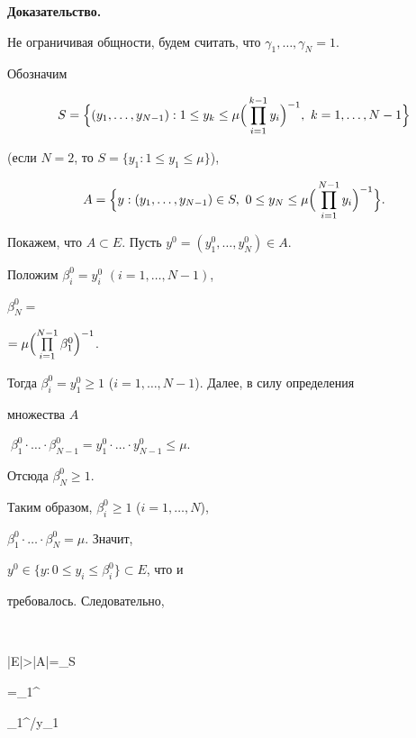  


{\bf Доказательство.} 


Не ограничивая общности, будем считать, что $\gamma_1,\dotsc,\gamma_N=1$.


Обозначим 


$$ 


S=\Bigl\{(y_1,\dotsc,y_{N-1}):1\le y_k\le \mu 


\Bigl(\,\prod^{k-1}_{i=1}y_i\Bigr)^{-1}, \ k=1,\dotsc,N-1\Bigr\} 


$$ 


(если $N=2$, то $S=\{y_1:1\le y_1\le\mu\}$), 


$$ 


A=\Bigl\{y:(y_1,\dotsc,y_{N-1})\in S, \ 


0\le y_N\le \mu 


\Bigl(\,\prod^{N-1}_{i=1}y_i\Bigr)^{-1}\Bigr\}. 


$$ 


Покажем, что $A\subset E$. Пусть $y^0=(y^0_1,\dotsc,y^0_N)\in A$. 


Положим $\beta^0_i=y^0_i$ $(i=1,\dotsc,N-1)$, 


$\beta^0_N=$\linebreak




$=\mu\Bigl(\prod\limits^{N-1}_{i=1}\beta^0_1\Bigr)^{-1}$. 


Тогда $\beta^0_i=y^0_1\ge 1$ ($i=1,\dotsc,N-1$). Далее, в силу определения 


множества $A\;$ 


$\;\beta^0_1\cdot\dotsc\cdot\beta^0_{N-1}= 


y^0_1\cdot\dotsc\cdot y^0_{N-1}\le\mu$. 


Отсюда $\beta^0_N\ge 1$. 


 


Таким образом, $\beta^0_i\ge 1$ ($i=1,\dotsc,N$), 


$\beta^0_1\cdot\dotsc\cdot\beta^0_N=\mu$. Значит, 


$y^0\in\{y:0\le y_i\le\beta^0_i\}\subset E$, что и 


требовалось. Следовательно, 


$$ 


|E|>|A|=\mu\idotsint\limits_S 


=\mu\int\limits_1^\mu{} 


\int\limits_1^{\mu/y_1}\dotsm 


